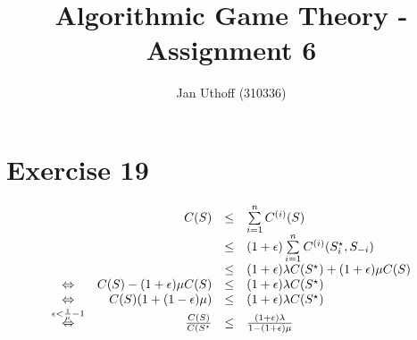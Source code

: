 \documentclass[10pt]{article}
\title{Algorithmic Game Theory - Assignment 6}
\author{Jan Uthoff (310336)}
\begin{document}
\section*{Exercise 19}
  \begin{displaymath}
    \begin{array}{c r c l }
     & C(S) & \leq & \sum\limits^{n}_{i=1} C^{(i)}(S) \\
     &      & \leq & (1+\epsilon)\sum\limits^{n}_{i=1}
                  C^{(i)}(S^{\star}_{i},S_{-i}) \\
     &      & \leq & (1+\epsilon)\lambda C(S^{\star})+(1+\epsilon)\mu C(S) \\
     \Leftrightarrow& C(S)-(1+\epsilon)\mu C(S) & \leq & (1+\epsilon)\lambda
                    C(S^{\star}) \\
     \Leftrightarrow& C(S)(1+(1-\epsilon)\mu) &\leq& (1+\epsilon)\lambda
                    C(S^{\star}) \\
     \overset{\epsilon < \frac{1}{\mu} - 1}{\Leftrightarrow}
     &\frac{C(S)}{C(S^{\star}}&\leq&
     \frac{(1+\epsilon)\lambda}{1-(1+\epsilon)\mu}
    \end{array}
  \end{displaymath}
\end{document}

